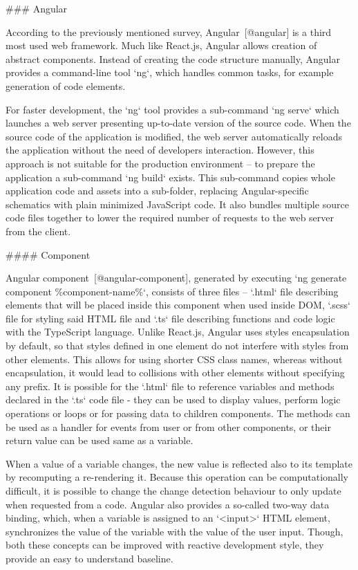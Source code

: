 \documentclass[
  digital, %
  oneside, %
  lof,     %
  lot,     %
]{fithesis4}
\begin{document}
{### Angular

According to the previously mentioned survey, Angular~[@angular] is a third most used web framework. Much like React.js, Angular allows creation of abstract components. Instead of creating the code structure manually, Angular provides a command-line tool `ng`, which handles common tasks, for example generation of code elements.

For faster development, the `ng` tool provides a sub-command `ng serve` which launches a web server presenting up-to-date version of the source code. When the source code of the application is modified, the web server automatically reloads the application without the need of developers interaction. However, this approach is not suitable for the production environment -- to prepare the application a sub-command `ng build` exists. This sub-command copies whole application code and assets into a sub-folder, replacing Angular-specific schematics with plain minimized JavaScript code. It also bundles multiple source code files together to lower the required number of requests to the web server from the client.

#### Component

Angular component~[@angular-component], generated by executing `ng generate component \%component-name\%`, consists of three files -- `.html` file describing elements that will be placed inside this component when used inside DOM, `.scss` file for styling said HTML file and `.ts` file describing functions and code logic with the TypeScript language. Unlike React.js, Angular uses styles encapsulation by default, so that styles defined in one element do not interfere with styles from other elements. This allows for using shorter CSS class names, whereas without encapsulation, it would lead to collisions with other elements without specifying any prefix. It is possible for the `.html` file to reference variables and methods declared in the `.ts` code file - they can be used to display values, perform logic operations or loops or for passing data to children components. The methods can be used as a handler for events from user or from other components, or their return value can be used same as a variable.

When a value of a variable changes, the new value is reflected also to its template by recomputing a re-rendering it. Because this operation can be computationally difficult, it is possible to change the change detection behaviour to only update when requested from a code. Angular also provides a so-called two-way data binding, which, when a variable is assigned to an `<input>` HTML element, synchronizes the value of the variable with the value of the user input. Though, both these concepts can be improved with reactive development style, they provide an easy to understand baseline.

}
\end{document}
